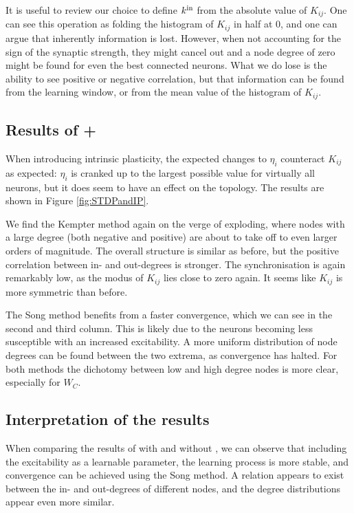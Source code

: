 It is useful to review our choice to define ${k^{\rm in}}$ from the absolute value of $K_{ij}$. One can see this operation as folding the histogram of $K_{ij}$ in half at 0, and one can argue that inherently information is lost. However, when not accounting for the sign of the synaptic strength, they might cancel out and a node degree of zero might be found for even the best connected neurons. What we do lose is the ability to see positive or negative correlation, but that information can be found from the learning window, or from the mean value of the histogram of $K_{ij}$.


\subsection{Results of \STDP + \IP} \label{sec:STDPandIPlearning}
When introducing intrinsic plasticity, the expected changes to $\eta_i$ counteract $K_{ij}$ as expected: $\eta_i$ is cranked up to the largest possible value for virtually all neurons, but it does seem to have an effect on the topology. The results are shown in Figure \ref{fig:STDPandIP}. 

We find the Kempter method again on the verge of exploding, where nodes with a large degree (both negative and positive) are about to take off to even larger orders of magnitude. The overall structure is similar as before, but the positive correlation between in- and out-degrees is stronger. The synchronisation is again remarkably low, as the modus of $K_{ij}$ lies close to zero again. It seems like $K_{ij}$ is more symmetric than before.

The Song method benefits from a faster convergence, which we can see in the second and third column. This is likely due to the neurons becoming less susceptible with an increased excitability. A more uniform distribution of node degrees can be found between the two extrema, as convergence has halted. For both methods the dichotomy between low and high degree nodes is more clear, especially for $W_C$.

\subsection{Interpretation of the results}
When comparing the results of \STDP with and without \IP, we can observe that including the excitability as a learnable parameter, the learning process is more stable, and convergence can be achieved using the Song method. A relation appears to exist between the in- and out-degrees of different nodes, and the degree distributions appear even more similar.


